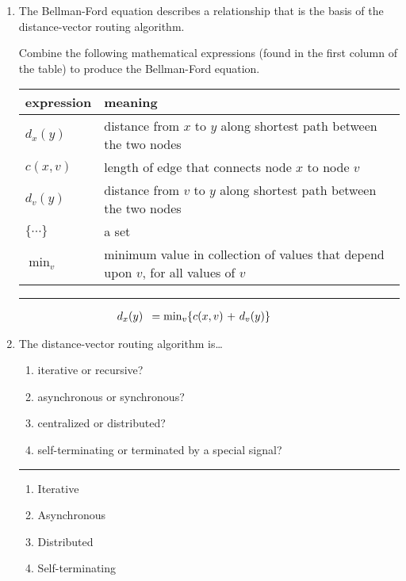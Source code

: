 \documentclass[twoside]{article}
\newenvironment{answer}
  {\vspace*{0.2cm} \rule{12cm}{0.04cm} \vspace*{0.2cm}}
  {\vspace*{0.2cm}}
\begin{document}
\begin{enumerate}
\begin{answer}
    \end{answer}

  \item The Bellman-Ford equation describes a relationship that
    is the basis of the distance-vector routing algorithm.

    Combine the following mathematical expressions
    (found in the first column of the table) to produce the Bellman-Ford equation.

  \begin{tabular}{ll}
    \textbf{expression} & \textbf{meaning} \\ \hline
    $d_x(y)$ & distance from $x$ to $y$ along shortest path between the two nodes\\
    $c(x,v)$ & length of edge that connects node $x$ to node $v$ \\
    $d_v(y)$ & distance from $v$ to $y$ along shortest path between the two nodes \\
    $\{ \cdots \}$ & a set \\
    ${\min}_v$ & \parbox[t]{10cm}{minimum value in collection of values that
      depend upon $v$, for all values of $v$}
    \end{tabular}

  \begin{answer}

  \begin{align*}
    \parbox{1cm}{$d_x(y)$} & = \parbox{4cm}{${\min}_v$\{$c(x,v)$ + $d_v(y)$\}}
    \end{align*}

    \end{answer}

  \item The distance-vector routing algorithm is\ldots
  \begin{enumerate}
    \item iterative or recursive?
    \item asynchronous or synchronous?
    \item centralized or distributed?
    \item self-terminating or terminated by a special signal?
    \end{enumerate}

  \begin{answer}

  \begin{enumerate}
    \item Iterative
    \item Asynchronous
    \item Distributed
    \item Self-terminating
    \end{enumerate}


\end{answer}
\end{enumerate}
\end{document}
